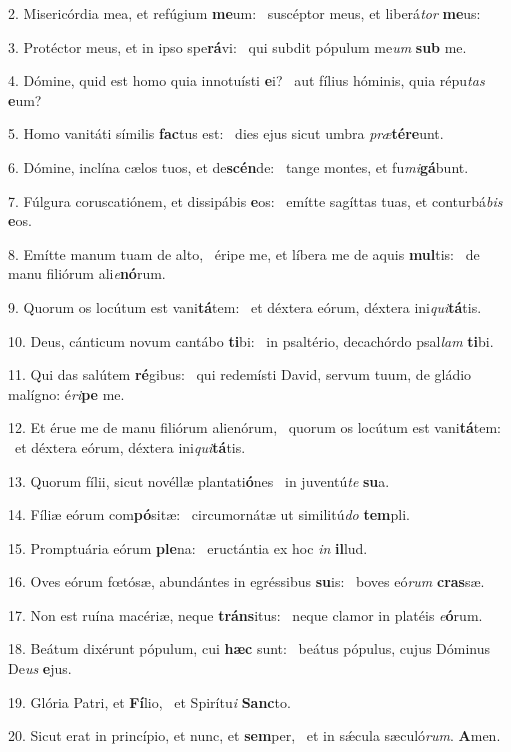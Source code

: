 2. Misericórdia mea, et refúgium \textbf{me}um: \ast\  suscéptor meus, et liberá\textit{tor} \textbf{me}us:\

3. Protéctor meus, et in ipso spe\textbf{rá}vi: \ast\  qui subdit pópulum me\textit{um} \textbf{sub} me.\

4. Dómine, quid est homo quia innotuísti \textbf{e}i? \ast\  aut fílius hóminis, quia répu\textit{tas} \textbf{e}um?\

5. Homo vanitáti símilis \textbf{fac}tus est: \ast\  dies ejus sicut umbra \textit{præ}\textbf{tér}\textbf{e}unt.\

6. Dómine, inclína cælos tuos, et de\textbf{scén}de: \ast\  tange montes, et fu\textit{mi}\textbf{gá}bunt.\

7. Fúlgura coruscatiónem, et dissipábis \textbf{e}os: \ast\  emítte sagíttas tuas, et conturbá\textit{bis} \textbf{e}os.\

8. Emítte manum tuam de alto, \dag\  éripe me, et líbera me de aquis \textbf{mul}tis: \ast\  de manu filiórum ali\textit{e}\textbf{nó}rum.\

9. Quorum os locútum est vani\textbf{tá}tem: \ast\  et déxtera eórum, déxtera ini\textit{qui}\textbf{tá}tis.\

10. Deus, cánticum novum cantábo \textbf{ti}bi: \ast\  in psaltério, decachórdo psal\textit{lam} \textbf{ti}bi.\

11. Qui das salútem \textbf{ré}gibus: \ast\  qui redemísti David, servum tuum, de gládio malígno: é\textit{ri}\textbf{pe} me.\

12. Et érue me de manu filiórum alienórum, \dag\  quorum os locútum est vani\textbf{tá}tem: \ast\  et déxtera eórum, déxtera ini\textit{qui}\textbf{tá}tis.\

13. Quorum fílii, sicut novéllæ plantati\textbf{ó}nes \ast\  in juventú\textit{te} \textbf{su}a.\

14. Fíliæ eórum com\textbf{pó}sitæ: \ast\  circumornátæ ut similitú\textit{do} \textbf{tem}pli.\

15. Promptuária eórum \textbf{ple}na: \ast\  eructántia ex hoc \textit{in} \textbf{il}lud.\

16. Oves eórum fœtósæ, abundántes in egréssibus \textbf{su}is: \ast\  boves eó\textit{rum} \textbf{cras}sæ.\

17. Non est ruína macériæ, neque \textbf{tráns}itus: \ast\  neque clamor in platéis \textit{e}\textbf{ó}rum.\

18. Beátum dixérunt pópulum, cui \textbf{hæc} sunt: \ast\  beátus pópulus, cujus Dóminus De\textit{us} \textbf{e}jus.\

19. Glória Patri, et \textbf{Fí}lio, \ast\  et Spirítu\textit{i} \textbf{Sanc}to.\

20. Sicut erat in princípio, et nunc, et \textbf{sem}per, \ast\  et in sǽcula sæculó\textit{rum}. \textbf{A}men.\

